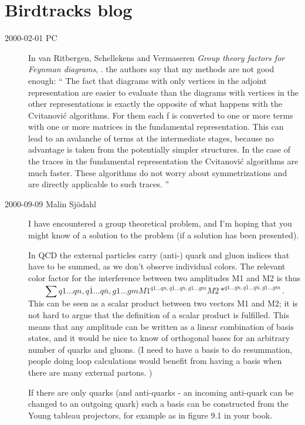 \section{Birdtracks blog}
\label{s-birdtrBlog}

\begin{description}

\item[2000-02-01 PC]
In van Ritbergen, Schellekens and Vermaseren
{\em Group theory factors for {Feynman} diagrams},
.
the authors say that my methods are not good enough: ``
The fact that diagrams with only vertices in the adjoint representation
are easier to evaluate than the diagrams with vertices in the other
representations is exactly the opposite of what happens with the
Cvitanovi{\'c} algorithms. For them each f is converted to
one or more terms with one or more matrices in the fundamental
representation. This can lead to an avalanche of terms at the
intermediate stages, because no advantage is taken from the potentially
simpler structures. In the case of the traces in the fundamental
representation the Cvitanovi{\'c} algorithms are much faster. These
algorithms do not worry about symmetrizations and are directly applicable
to such traces.
''

\item[2000-09-09 Malin Sj{\"o}dahl]
I have encountered a group theoretical problem, and I'm hoping that you might
know of a solution to the problem (if a solution has been presented).

In QCD the external particles carry (anti-) quark and gluon indices that have
to be summed, as we don't observe individual colors. The relevant color
factor for the interference between two amplitudes M1 and M2 is thus
\[
\sum{q1...qn, q\bar{1}...q\bar{n},g1...gm}
      M1^{q1...qn, q\bar{1}...q\bar{n},g1...gm}
      M2*^{q1...qn, q\bar{1}...q\bar{n},g1...gm}.
\]
This can be seen as a scalar product between two vectors M1 and M2; it is not
hard to argue that the definition of a scalar product is fulfilled. This
means that any amplitude can be written as a linear combination of basis
states, and it would be nice to know of orthogonal bases for an arbitrary
number of quarks and gluons. (I need to have a basis to do resummation,
people doing loop calculations would benefit from having a basis when there
are many external partons. )

If there are only quarks (and anti-quarks - an incoming anti-quark can be
changed to an outgoing quark) such a basis can be constructed from the Young
tableau projectors, for example as in figure 9.1 in your book.


\end{description}
